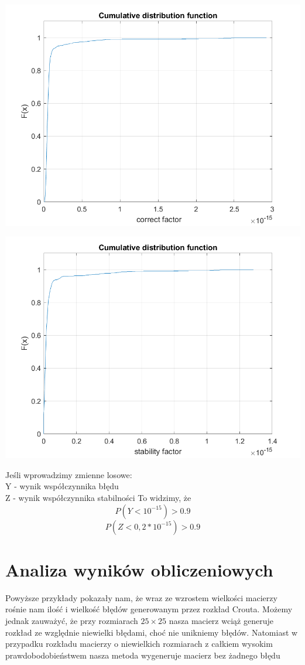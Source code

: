 \documentclass{article}\usepackage{amsmath,amsfonts,amssymb}
\begin{document}
\begin{center}
   \includegraphics[scale=1]{correct_factor_cdf.png}
\end{center}
\begin{center}
   \includegraphics[scale=1]{stability_factor_cdf.png}
\end{center}

Jeśli wprowadzimy zmienne losowe: \\
Y - wynik współczynnika błędu \\
Z - wynik współczynnika stabilności
To widzimy, że 
\[P(Y < 10^{-15}) > 0.9\] 
\[P(Z < 0,2 * 10^{-15}) > 0.9\] 


 
  


\section{Analiza wyników obliczeniowych}
Powyższe przykłady pokazały nam, że wraz ze wzrostem wielkości macierzy rośnie nam ilość i wielkość błędów generowanym przez rozkład Crouta. Możemy jednak zauważyć, że przy rozmiarach $25 \times 25$ nasza macierz wciąż generuje rozkład ze względnie niewielki błędami, choć nie unikniemy błędów. Natomiast w przypadku rozkładu macierzy o niewielkich rozmiarach z całkiem wysokim prawdobodobieństwem nasza metoda wygeneruje macierz bez żadnego błędu
\end{document}
